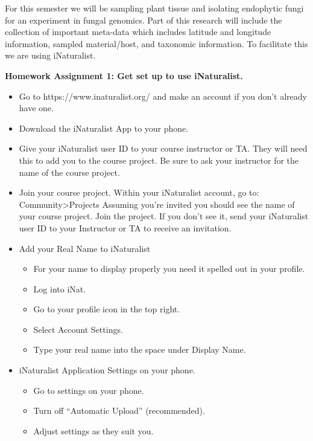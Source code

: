 \documentclass[
  letterpaper,
  DIV=11,
  numbers=noendperiod]{scrreprt}
\providecommand{\tightlist}{%
  \setlength{\itemsep}{0pt}\setlength{\parskip}{0pt}}
\begin{document}
For this semester we will be sampling plant tissue and isolating
endophytic fungi for an experiment in fungal genomics. Part of this
research will include the collection of important meta-data which
includes latitude and longitude information, sampled material/host, and
taxonomic information. To facilitate this we are using iNaturalist.

\textbf{Homework Assignment 1: Get set up to use iNaturalist.}

\begin{itemize}
\tightlist
\item
  Go to https://www.inaturalist.org/ and make an account if you don't
  already have one.
\item
  Download the iNaturalist App to your phone.
\item
  Give your iNaturalist user ID to your course instructor or TA. They
  will need this to add you to the course project. Be sure to ask your
  instructor for the name of the course project.
\item
  Join your course project. Within your iNaturalist account, go to:
  Community\textgreater Projects Assuming you're invited you should see
  the name of your course project. Join the project. If you don't see
  it, send your iNaturalist user ID to your Instructor or TA to receive
  an invitation.
\item
  Add your Real Name to iNaturalist

  \begin{itemize}
  \tightlist
  \item
    For your name to display properly you need it spelled out in your
    profile.
  \item
    Log into iNat.
  \item
    Go to your profile icon in the top right.
  \item
    Select Account Settings.
  \item
    Type your real name into the space under Display Name.
  \end{itemize}
\item
  iNaturalist Application Settings on your phone.

  \begin{itemize}
  \tightlist
  \item
    Go to settings on your phone.
  \item
    Turn off ``Automatic Upload'' (recommended).
  \item
    Adjust settings as they suit you.
  \end{itemize}
\end{itemize}
\end{document}

